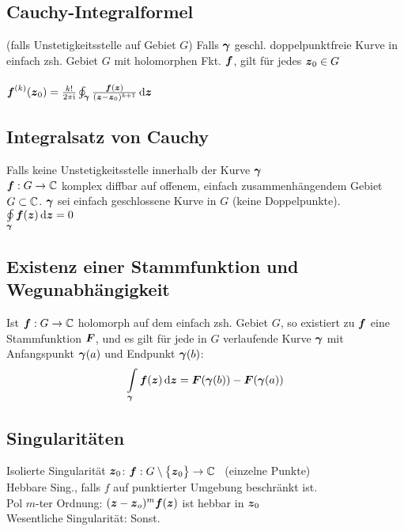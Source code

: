\documentclass[german,color,6pt]{latex4ei/latex4ei_fs}
\begin{document}
\begin{sectionbox}
	\subsection{Cauchy-Integralformel}
	(falls Unstetigkeitsstelle auf Gebiet $G$)
	Falls $\boldsymbol{\gamma}$ geschl. doppelpunktfreie Kurve in einfach zsh. Gebiet $G$ mit holomorphen Fkt. $\boldsymbol{f}$, gilt für jedes $\boldsymbol{z}_0 \in G$\\
	\\
	$\cx f^{(k)}(\cx z_0) = \frac{k!}{2\pi \i} \oint_{\cx \gamma} \frac{\cx f(\cx z)}{(\cx z - \cx z_0)^{k+1}} \diff \cx z$ 
	
	\subsection{Integralsatz von Cauchy}
	Falls keine Unstetigkeitsstelle innerhalb der Kurve $\boldsymbol{\gamma}$\\ 
	$\boldsymbol{f}: G \rightarrow \mathbb C$ komplex diffbar auf offenem, einfach zusammenhängendem Gebiet $G \subset \mathbb C$. $\boldsymbol{\gamma}$ sei einfach geschlossene Kurve in $G$ (keine Doppelpunkte). \\
	$\oint \limits_{\cx \gamma} \cx f(\cx z) \diff \cx z = 0$
	
	\subsection{Existenz einer Stammfunktion und Wegunabhängigkeit}
	Ist $\boldsymbol{f}: G \rightarrow \mathbb C$ holomorph auf dem einfach zsh. Gebiet $G$, so existiert zu $\boldsymbol{f}$ eine Stammfunktion $\boldsymbol{F}$, und es gilt für jede in $G$ verlaufende Kurve $\boldsymbol{\gamma}$ mit Anfangspunkt $\boldsymbol{\gamma}(a)$ und Endpunkt $\boldsymbol{\gamma}(b)$: \\
	\begin{equation*}
		\int \limits_{\cx \gamma} \cx f(\cx z) \diff \cx z = \cx F(\cx \gamma (b)) - \cx F(\cx \gamma (a))
	\end{equation*}
\end{sectionbox}

\begin{sectionbox}
	\subsection{Singularitäten}
	Isolierte Singularität $\boldsymbol{z}_0$: \quad $\boldsymbol{f} :G \setminus \bigl\{\boldsymbol{z}_0\bigr\} \rightarrow \mathbb C$ \ (einzelne Punkte)\\
	Hebbare Sing., falls $f$ auf punktierter Umgebung beschränkt ist.\\
	Pol $m$-ter Ordnung: $(\boldsymbol{z} - \boldsymbol{z}_o)^m \boldsymbol{f}(\boldsymbol{z})$ ist hebbar in $\boldsymbol{z}_0$\\
	Wesentliche Singularität: Sonst.
\end{sectionbox}
\end{document}
